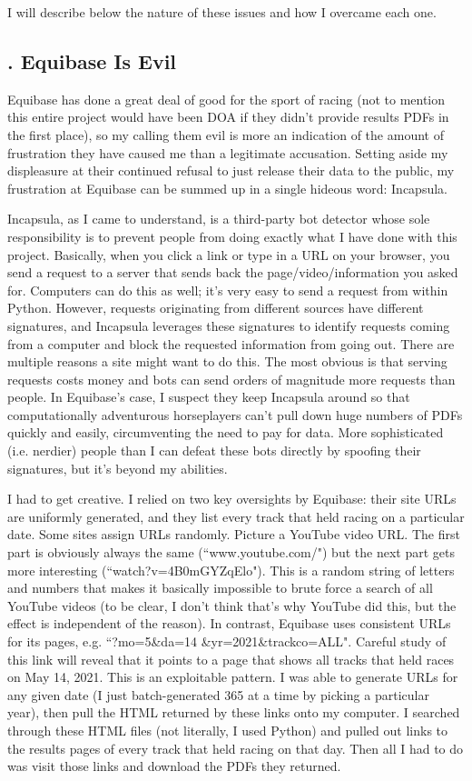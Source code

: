 \documentclass{article}
\begin{document}
\noindent I will describe below the nature of these issues and how I overcame each one.

\subsection*{. Equibase Is Evil}

Equibase has done a great deal of good for the sport of racing (not to mention this entire project would have been DOA if they didn't provide results PDFs in the first place), so my calling them evil is more an indication of the amount of frustration they have caused me than a legitimate accusation. Setting aside my displeasure at their continued refusal to just release their data to the public, my frustration at Equibase can be summed up in a single hideous word: Incapsula.

Incapsula, as I came to understand, is a third-party bot detector whose sole responsibility is to prevent people from doing exactly what I have done with this project. Basically, when you click a link or type in a URL on your browser, you send a request to a server that sends back the page/video/information you asked for. Computers can do this as well; it's very easy to send a request from within Python. However, requests originating from different sources have different signatures, and Incapsula leverages these signatures to identify requests coming from a computer and block the requested information from going out. There are multiple reasons a site might want to do this. The most obvious is that serving requests costs money and bots can send orders of magnitude more requests than people. In Equibase's case, I suspect they keep Incapsula around so that computationally adventurous horseplayers can't pull down huge numbers of PDFs quickly and easily, circumventing the need to pay for data. More sophisticated (i.e. nerdier) people than I can defeat these bots directly by spoofing their signatures, but it's beyond my abilities.

I had to get creative. I relied on two key oversights by Equibase: their site URLs are uniformly generated, and they list every track that held racing on a particular date. Some sites assign URLs randomly. Picture a YouTube video URL. The first part is obviously always the same (``www.youtube.com/") but the next part gets more interesting (``watch?v=4B0mGYZqElo"). This is a random string of letters and numbers that makes it basically impossible to brute force a search of all YouTube videos (to be clear, I don't think that's why YouTube did this, but the effect is independent of the reason). In contrast, Equibase uses consistent URLs for its pages, e.g. ``?mo=5\&da=14 \&yr=2021\&trackco=ALL". Careful study of this link will reveal that it points to a page that shows all tracks that held races on May 14, 2021. This is an exploitable pattern. I was able to generate URLs for any given date (I just batch-generated 365 at a time by picking a particular year), then pull the HTML returned by these links onto my computer. I searched through these HTML files (not literally, I used Python) and pulled out links to the results pages of every track that held racing on that day. Then all I had to do was visit those links and download the PDFs they returned.
\end{document}
